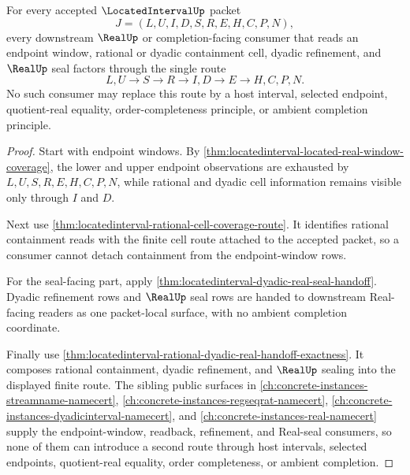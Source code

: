\begin{theorem}
\label{thm:locatedinterval-window-cell-seal-unification}
For every accepted $\LocatedIntervalUp$ packet
$$
J=(L,U,I,D,S,R,E,H,C,P,N),
$$
every downstream $\RealUp$ or completion-facing consumer that reads an endpoint window, rational or dyadic containment cell, dyadic refinement, and $\RealUp$ seal factors through the single route
$$
L,U \to S \to R \to I,D \to E \to H,C,P,N.
$$
No such consumer may replace this route by a host interval, selected endpoint, quotient-real equality, order-completeness principle, or ambient completion principle.
\end{theorem}
\begin{proof}
Start with endpoint windows. By \autoref{thm:locatedinterval-located-real-window-coverage}, the lower and upper endpoint observations are exhausted by $L,U,S,R,E,H,C,P,N$, while rational and dyadic cell information remains visible only through $I$ and $D$.

Next use \autoref{thm:locatedinterval-rational-cell-coverage-route}. It identifies rational containment reads with the finite cell route attached to the accepted packet, so a consumer cannot detach containment from the endpoint-window rows.

For the seal-facing part, apply \autoref{thm:locatedinterval-dyadic-real-seal-handoff}. Dyadic refinement rows and $\RealUp$ seal rows are handed to downstream Real-facing readers as one packet-local surface, with no ambient completion coordinate.

Finally use \autoref{thm:locatedinterval-rational-dyadic-real-handoff-exactness}. It composes rational containment, dyadic refinement, and $\RealUp$ sealing into the displayed finite route. The sibling public surfaces in \autoref{ch:concrete-instances-streamname-namecert}, \autoref{ch:concrete-instances-regseqrat-namecert}, \autoref{ch:concrete-instances-dyadicinterval-namecert}, and \autoref{ch:concrete-instances-real-namecert} supply the endpoint-window, readback, refinement, and Real-seal consumers, so none of them can introduce a second route through host intervals, selected endpoints, quotient-real equality, order completeness, or ambient completion.
\end{proof}


